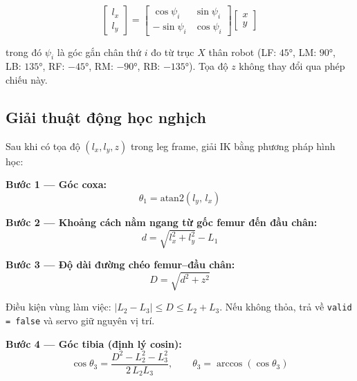         \begin{equation}
            \begin{bmatrix} l_x \\ l_y \end{bmatrix}
            =
            \begin{bmatrix} \cos\psi_i & \sin\psi_i \\ -\sin\psi_i & \cos\psi_i \end{bmatrix}
            \begin{bmatrix} x \\ y \end{bmatrix}
        \end{equation}

        trong đó $\psi_i$ là góc gắn chân thứ $i$ đo từ trục $X$ thân robot (LF: $45°$, LM: $90°$, LB: $135°$, RF: $-45°$, RM: $-90°$, RB: $-135°$). Tọa độ $z$ không thay đổi qua phép chiếu này.

        \subsection{Giải thuật động học nghịch}

        \hspace{0.5cm} Sau khi có tọa độ $(l_x, l_y, z)$ trong leg frame, giải IK bằng phương pháp hình học:

        \textbf{Bước 1 — Góc coxa:}
        \begin{equation}
            \theta_1 = \mathrm{atan2}(l_y,\, l_x)
        \end{equation}

        \textbf{Bước 2 — Khoảng cách nằm ngang từ gốc femur đến đầu chân:}
        \begin{equation}
            d = \sqrt{l_x^2 + l_y^2} - L_1
        \end{equation}

        \textbf{Bước 3 — Độ dài đường chéo femur–đầu chân:}
        \begin{equation}
            D = \sqrt{d^2 + z^2}
        \end{equation}

        Điều kiện vùng làm việc: $|L_2 - L_3| \leq D \leq L_2 + L_3$. Nếu không thỏa, trả về \texttt{valid = false} và servo giữ nguyên vị trí.

        \textbf{Bước 4 — Góc tibia (định lý cosin):}
        \begin{equation}
            \cos\theta_3 = \frac{D^2 - L_2^2 - L_3^2}{2\,L_2 L_3}, \qquad \theta_3 = \arccos(\cos\theta_3)
        \end{equation}

